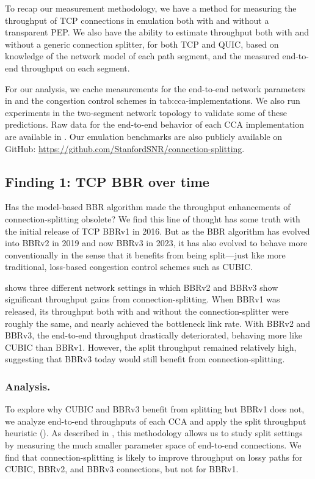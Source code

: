 \noindent To recap our measurement methodology, we have a method for
 measuring the throughput of TCP connections in emulation both with and without a
 transparent PEP. We also have the ability to estimate throughput both with and
 without a generic connection splitter, for both TCP and QUIC, based on
 knowledge of the network model of each path segment, and the measured end-to-end
 throughput on each segment.

For our analysis, we cache measurements for the end-to-end network parameters
in  and the congestion control schemes in \Cref
{tab:cca-implementations}. We also run experiments in the two-segment network topology
to validate some of these predictions. Raw data for the end-to-end
behavior of each CCA implementation are available in .
Our emulation benchmarks are also publicly available on GitHub: \url{https://github.com/StanfordSNR/connection-splitting}.

\subsection{Finding 1: TCP BBR over time}
\label{sec:splitting:results:finding1}


Has the model-based BBR algorithm made the throughput enhancements of
connection-splitting obsolete? We find this line of thought has some truth
with the initial release of TCP BBRv1 in 2016. But as the BBR algorithm has
evolved into BBRv2 in 2019 and now BBRv3 in 2023, it has also evolved to behave
more conventionally in the sense that it benefits from being split---just like
more traditional, loss-based congestion control schemes such as CUBIC.

 shows three different network settings in which BBRv2
and BBRv3 show significant throughput gains from connection-splitting.
 When BBRv1 was released, its throughput both with and
 without the connection-splitter were roughly the same, and nearly achieved the
 bottleneck link rate. With BBRv2 and BBRv3, the end-to-end throughput
 drastically deteriorated, behaving more like CUBIC than BBRv1. However, the
 split throughput remained relatively high, suggesting that BBRv3 today would
 still benefit from connection-splitting.

\subsubsection{Analysis.}
To explore why CUBIC and BBRv3 benefit from splitting but BBRv1 does not, we
analyze end-to-end throughputs of each CCA and apply the split throughput
heuristic (). As described in ,
this methodology allows us to study split settings by measuring the much smaller
parameter space of end-to-end connections. We find that connection-splitting is
likely to improve throughput on lossy paths for CUBIC, BBRv2, and BBRv3
connections, but not for BBRv1.

